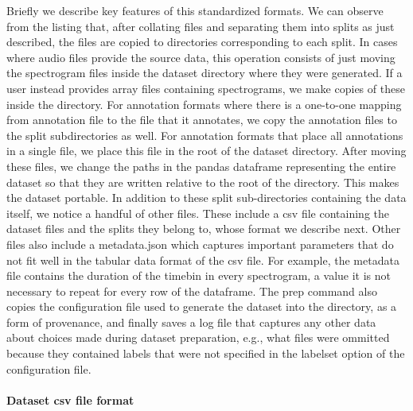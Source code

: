 Briefly we describe key features of this standardized formats.
We can observe from the listing that, after collating files
and separating them into splits as just described,
the files are copied to directories corresponding to each split.
In cases where audio files provide the source data,
this operation consists of just moving the spectrogram files
inside the dataset directory where they were generated.
If a user instead provides array files containing spectrograms,
we make copies of these inside the directory.
For annotation formats where there is a one-to-one mapping from annotation file
to the file that it annotates, we copy the annotation files to the split
subdirectories as well.
For annotation formats that place all annotations in a single file,
we place this file in the root of the dataset directory.
After moving these files, we change the paths in the pandas dataframe
representing the entire dataset so that they are written relative
to the root of the directory. This makes the dataset portable.
In addition to these split sub-directories containing the data itself,
we notice a handful of other files.
These include a csv file containing the dataset files and the splits they belong to, whose format we describe next.
Other files also include a metadata.json
which captures important parameters that do not fit well
in the tabular data format of the csv file.
For example, the metadata file contains the duration of the timebin
in every spectrogram, a value it is not necessary to repeat
for every row of the dataframe.
The prep command also copies the configuration file used to generate the dataset
into the directory, as a form of provenance,
and finally saves a log file
that captures any other data about choices made during dataset preparation,
e.g., what files were ommitted because they contained labels
that were not specified in the labelset option of the configuration file.

\paragraph{Dataset csv file format}

